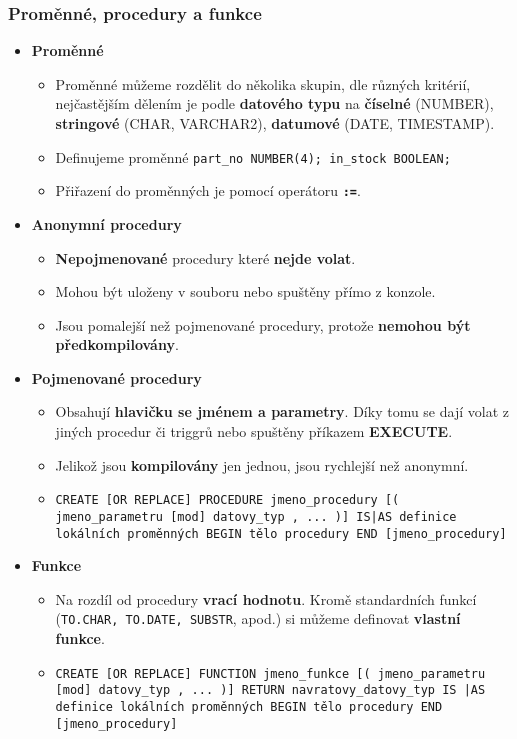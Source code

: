 \subsubsection{Proměnné, procedury a funkce}
\begin{itemize}
	\item \textbf{Proměnné}
\begin{itemize}
\item Proměnné můžeme rozdělit do několika skupin, dle různých kritérií, nejčastějším dělením je podle \textbf{datového typu} na \textbf{číselné} (NUMBER), \textbf{stringové} (CHAR, VARCHAR2), \textbf{datumové} (DATE, TIMESTAMP).
\item Definujeme proměnné \texttt{part\_no NUMBER(4); in\_stock BOOLEAN;}
\item Přiřazení do proměnných je pomocí operátoru \textbf{\texttt{:=}}.
\end{itemize}

\item \textbf{Anonymní procedury}
\begin{itemize}
\item \textbf{Nepojmenované} procedury které \textbf{nejde volat}.
\item Mohou být uloženy v souboru nebo spuštěny přímo z konzole.
\item Jsou pomalejší než pojmenované procedury, protože \textbf{nemohou být předkompilovány}.
\end{itemize}

\item \textbf{Pojmenované procedury}
\begin{itemize}
\item Obsahují \textbf{hlavičku se jménem a parametry}. Díky tomu se dají volat z jiných procedur či triggrů nebo spuštěny příkazem \textbf{EXECUTE}.
\item Jelikož jsou \textbf{kompilovány} jen jednou, jsou rychlejší než anonymní.
\item \texttt{CREATE [OR REPLACE] PROCEDURE jmeno\_procedury [( jmeno\_parametru [mod] datovy\_typ , ... )] IS|AS definice lokálních proměnných BEGIN tělo procedury END [jmeno\_procedury]}
\end{itemize}

\item \textbf{Funkce}
\begin{itemize}
\item Na rozdíl od procedury \textbf{vrací hodnotu}. Kromě standardních funkcí (\texttt{TO.CHAR, TO.DATE, SUBSTR}, apod.) si můžeme definovat \textbf{vlastní funkce}.
\item \texttt{CREATE [OR REPLACE] FUNCTION jmeno\_funkce [( jmeno\_parametru [mod] datovy\_typ , ... )] RETURN navratovy\_datovy\_typ IS |AS definice lokálních proměnných BEGIN tělo procedury END [jmeno\_procedury]}
\end{itemize}
\end{itemize}

